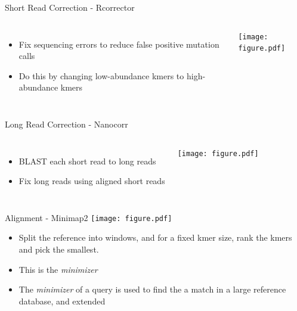 \documentclass{beamer}
\begin{document}
\begin{frame}{Short Read Correction - Rcorrector}
\begin{columns}
\begin{itemize}
\item Fix sequencing errors to reduce false positive mutation calls
\item Do this by changing low-abundance kmers to high-abundance kmers
\end{itemize}
\texttt{[image: figure.pdf]}
\end{columns}
\end{frame}

\begin{frame}{Long Read Correction - Nanocorr}
\begin{columns}
\begin{itemize}
	\item BLAST each short read to long reads
	\item Fix long reads using aligned short reads
\end{itemize}
\texttt{[image: figure.pdf]}
\end{columns}
\end{frame}

\begin{frame}{Alignment - Minimap2}
\texttt{[image: figure.pdf]}
\begin{itemize}
	\item Split the reference into windows, and for a fixed kmer size, rank the kmers and pick the smallest.
	\item This is the \textit{minimizer}
	\item The \textit{minimizer} of a query is used to find the a match in a large reference database, and extended 
\end{itemize}
\end{frame}
\end{document}
